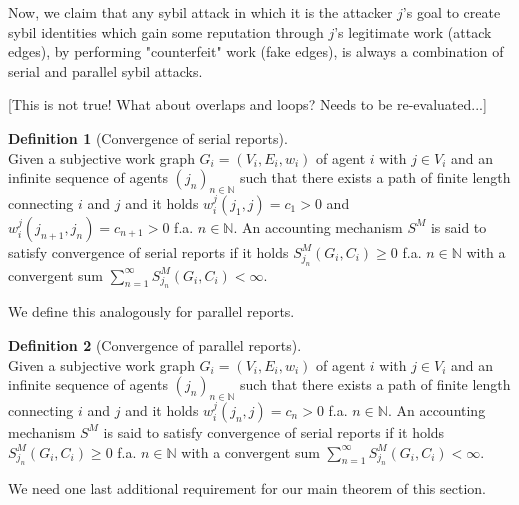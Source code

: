\documentclass[11pt,a4paper]{article}
\theoremstyle{definition}
\newtheorem{definition}{Definition}[section]
\theoremstyle{theorem}
\theoremstyle{proposition}
\theoremstyle{corollary}
\theoremstyle{lemma}
\theoremstyle{example}
\theoremstyle{remark}
\begin{document}
\noindent{}Now, we claim that any sybil attack in which it is the attacker $j$'s goal to create sybil identities which gain some reputation through $j$'s legitimate work (attack edges), by performing "counterfeit" work (fake edges), is always a combination of serial and parallel sybil attacks. \begin{center} [This is not true! What about overlaps and loops? Needs to be re-evaluated...] \vspace{1em}\\\end{center}

\begin{definition}[Convergence of serial reports]\ \\
Given a subjective work graph $G_i=(V_i,E_i,w_i)$ of agent $i$ with $j\in{}V_i$ and an infinite sequence of agents $(j_n)_{n\in\mathbb{N}}$ such that there exists a path of finite length connecting $i$ and $j$ and it holds $w_i^j(j_1,j)=c_1 > 0$ and $w_i^j(j_{n+1},j_n)=c_{n+1}>0$ f.a. $n\in\mathbb{N}$. An accounting mechanism $S^M$ is said to satisfy convergence of serial reports if it holds $S^M_{j_n}(G_i,C_i)\geq{}0$ f.a. $n\in\mathbb{N}$ with a convergent sum $\sum\limits_{n=1}^{\infty}S^M_{j_n}(G_i,C_i)<\infty$. 
\end{definition}

\noindent{}We define this analogously for parallel reports. \vspace{1em}\\

\begin{definition}[Convergence of parallel reports]\ \\
Given a subjective work graph $G_i=(V_i,E_i,w_i)$ of agent $i$ with $j\in{}V_i$ and an infinite sequence of agents $(j_n)_{n\in\mathbb{N}}$ such that there exists a path of finite length connecting $i$ and $j$ and it holds $w_i^j(j_n,j)=c_n > 0$ f.a. $n\in\mathbb{N}$. An accounting mechanism $S^M$ is said to satisfy convergence of serial reports if it holds $S^M_{j_n}(G_i,C_i)\geq{}0$ f.a. $n\in\mathbb{N}$ with a convergent sum $\sum\limits_{n=1}^{\infty}S^M_{j_n}(G_i,C_i)<\infty$.
\end{definition}

\noindent{}We need one last additional requirement for our main theorem of this section. \vspace{1em}\\
\end{document}
